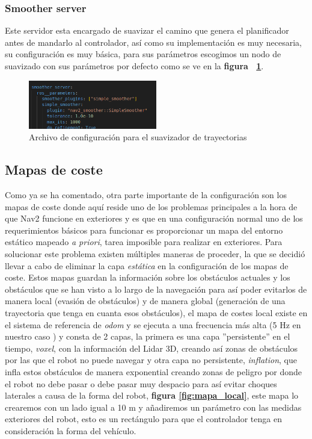 \subsubsection{Smoother server}
Este servidor esta encargado de suavizar el camino que genera el planificador antes de mandarlo al controlador, así como su implementación es muy necesaria,  
su configuración es muy básica, para sus parámetros escogimos un nodo de suavizado con sus parámetros por defecto como se ve en la \textbf{figura ~\ref{fig:parametros_smoother_server}}.

\begin{figure}[H]
    \centering
    \includegraphics[width=0.5\textwidth]{images/smoother_params.png}
    \caption{Archivo de configuración para el suavizador de trayectorias}
    \label{fig:parametros_smoother_server}
\end{figure}

\subsection{Mapas de coste}
Como ya se ha comentado, otra parte importante de la configuración son los mapas de coste donde aquí reside uno de los problemas principales 
a la hora de que Nav2 funcione en exteriores y es que en una configuración normal uno de los requerimientos básicos para funcionar es proporcionar 
un mapa del entorno estático mapeado \textit{a priori}, tarea imposible para realizar en exteriores. Para solucionar este problema existen múltiples maneras 
de proceder, la que se decidió llevar a cabo de eliminar la capa \textit{estática} en la configuración de los mapas de coste. Estos mapas guardan la 
información sobre los obstáculos actuales y los obstáculos que se han visto a lo largo de la navegación para así poder evitarlos de manera local (evasión de obstáculos) y 
de manera global (generación de una trayectoria que tenga en cuanta esos obstáculos), el mapa de costes local existe en el sistema de referencia de \textit{odom} y se ejecuta 
a una frecuencia más alta (5 Hz en nuestro caso ) y consta de 2 capas, la primera es una capa ''persistente'' en el tiempo, \textit{voxel}, con la información del Lidar 3D, creando así zonas de obstáculos por 
las que el robot no puede navegar y otra capa no persistente, \textit{inflation}, que infla estos obstáculos de manera exponential creando zonas 
de peligro por donde el robot no debe pasar o debe pasar muy despacio para así evitar choques laterales a causa de la forma del robot, \textbf{figura \ref{fig:mapa_local}}, este 
mapa lo crearemos con un lado igual a 10 m y añadiremos un parámetro con las medidas exteriores del robot, esto es un rectángulo para que el controlador tenga en consideración 
la forma del vehículo.

